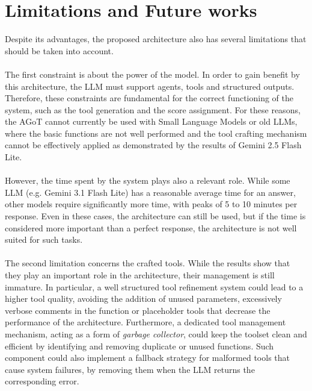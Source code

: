 \documentclass[12pt,a4paper,openright,twoside]{book}
\begin{document}
\section{Limitations and Future works}
Despite its advantages, the proposed architecture also has several limitations that should be taken into account.
\\\\
The first constraint is about the power of the model. In order to gain benefit by this architecture, the \ac{LLM} must support agents, tools and structured outputs.
Therefore, these constraints are fundamental for the correct functioning of the system, such as the tool generation and the score assignment. 
For these reasons, the \ac{AGoT} cannot currently be used with Small Language Models or old \acp{LLM}, where the basic functions are not well performed and the tool crafting mechanism cannot be effectively applied as demonstrated by the results of Gemini 2.5 Flash Lite.
\\\\
However, the time spent by the system plays also a relevant role. 
While some \ac{LLM} (e.g. Gemini 3.1 Flash Lite) has a reasonable average time for an answer, other models require significantly more time, with peaks of 5 to 10 minutes per response.
Even in these cases, the architecture can still be used, but if the time is considered more important than a perfect response, the architecture is not well suited for such tasks.
\\\\
The second limitation concerns the crafted tools. While the results show that they play an important role in the architecture, their management is still immature. 
In particular, a well structured tool refinement system could lead to a higher tool quality, avoiding the addition of unused parameters, excessively verbose comments in the function or placeholder tools that decrease the performance of the architecture.
Furthermore, a dedicated tool management mechanism, acting as a form of \textit{garbage collector}, could keep the toolset clean and efficient by identifying and removing duplicate or unused functions. 
Such component could also implement a fallback strategy for malformed tools that cause system failures, by removing them when the \ac{LLM} returns the corresponding error.
\end{document}
